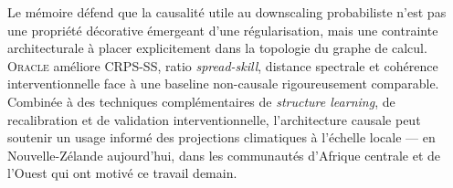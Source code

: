 \documentclass[14pt,a4paper,openany]{extreport}
\theoremstyle{definition}
\newcommand{\Oracle}{\textsc{Oracle}}
\begin{document}
Le mémoire défend que la causalité utile au downscaling probabiliste n'est pas une propriété décorative émergeant d'une régularisation, mais une contrainte architecturale à placer explicitement dans la topologie du graphe de calcul. \Oracle{} améliore CRPS-SS, ratio \emph{spread-skill}, distance spectrale et cohérence interventionnelle face à une baseline non-causale rigoureusement comparable. Combinée à des techniques complémentaires de \emph{structure learning}, de recalibration et de validation interventionnelle, l'architecture causale peut soutenir un usage informé des projections climatiques à l'échelle locale --- en Nouvelle-Zélande aujourd'hui, dans les communautés d'Afrique centrale et de l'Ouest qui ont motivé ce travail demain.

\cleardoublepage


\end{document}
